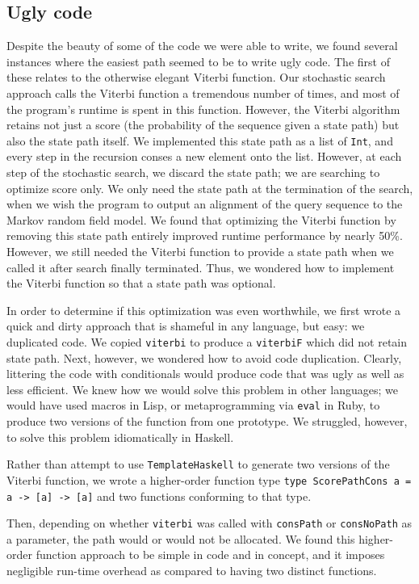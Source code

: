 \documentclass[preprint,nonatbib,blockstyle,nocopyrightspace,times]{sigplanconf}
\begin{document}
\subsection{Ugly code}


Despite the beauty of some of the code we were able to write, we found several 
instances where the easiest path seemed to be to write ugly code.
The first of 
these relates to the otherwise elegant Viterbi function.
Our stochastic search 
approach calls the Viterbi function a tremendous number of times, and most of 
the program's runtime is spent in this function.
However, the Viterbi algorithm 
retains not just a score (the probability of the sequence given a state path) 
but also the state path itself.
We implemented this state path as a list of 
\texttt{Int}, and every step in the recursion conses a new element onto the 
list.
However, at each step of the stochastic search, we discard the state 
path; we are searching to optimize score only.
We only need the state path at 
the termination of the search, when we wish the program to output an alignment 
of the query sequence to the Markov random field model.
We found that 
optimizing the Viterbi function by removing this state path entirely improved 
runtime performance by nearly 50\%.
However, we still needed the Viterbi 
function to provide a state path when we called it after search finally 
terminated.
Thus, we wondered how to implement the Viterbi function so that a 
state path was optional.

In order to determine if this optimization was even worthwhile, we first wrote 
a quick and dirty approach that is shameful in any language, but easy: we 
duplicated code.
We copied \texttt{viterbi} to produce a \texttt{viterbiF} 
which did not retain state path.
Next, however, we wondered how to avoid code 
duplication.
Clearly, littering the code with conditionals would produce code 
that was ugly as well as less efficient.
We knew how we would solve this 
problem in other languages; we would have used macros in Lisp, or 
metaprogramming via \texttt{eval} in Ruby, to produce two versions of the 
function from one prototype.
We struggled, however, to solve this problem 
idiomatically in Haskell.

Rather than attempt to use \texttt{TemplateHaskell} to generate two versions of 
the Viterbi function, we wrote a higher-order function type 
\lstinline!type ScorePathCons a = a -> [a] -> [a]! and two functions conforming to that type.

Then, depending on whether \texttt{viterbi} was called with \texttt{consPath} 
or \texttt{consNoPath} as a parameter, the path would or would not be 
allocated.
We found this higher-order function approach to be simple in code 
and in concept, and it imposes negligible run-time overhead as compared to 
having two distinct functions.
\end{document}
